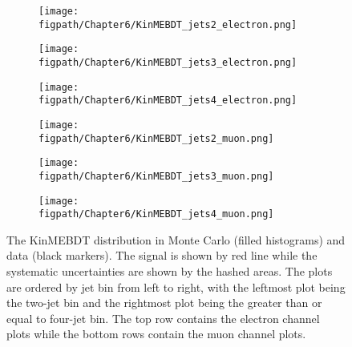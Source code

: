 \begin{figure}[!hbtp]
    \centering
    \begin{subfigure}[t]{0.316\textwidth}
        \texttt{[image: \\figpath/Chapter6/KinMEBDT\_jets2\_electron.png]}
        \caption{}
        \label{fig:KinMEBDT_jets2_electron}
    \end{subfigure}
    \begin{subfigure}[t]{0.316\textwidth}
        \texttt{[image: \\figpath/Chapter6/KinMEBDT\_jets3\_electron.png]}
        \caption{}
        \label{fig:KinMEBDT_jets3_electron}
    \end{subfigure}
    \begin{subfigure}[t]{0.316\textwidth}
        \texttt{[image: \\figpath/Chapter6/KinMEBDT\_jets4\_electron.png]}
        \caption{}
        \label{fig:KinMEBDT_jets4_electron}
    \end{subfigure}

    \begin{subfigure}[t]{0.316\textwidth}
        \texttt{[image: \\figpath/Chapter6/KinMEBDT\_jets2\_muon.png]}
        \caption{}
        \label{fig:KinMEBDT_jets2_muon}
    \end{subfigure}
    \begin{subfigure}[t]{0.316\textwidth}
        \texttt{[image: \\figpath/Chapter6/KinMEBDT\_jets3\_muon.png]}
        \caption{}
        \label{fig:KinMEBDT_jets3_muon}
    \end{subfigure}
    \begin{subfigure}[t]{0.316\textwidth}
        \texttt{[image: \\figpath/Chapter6/KinMEBDT\_jets4\_muon.png]}
        \caption{}
        \label{fig:KinMEBDT_jets4_muon}
    \end{subfigure}
    \caption{The KinMEBDT distribution in Monte Carlo (filled histograms) and data (black markers). The \HWW signal is shown by red line while the systematic uncertainties are shown by the hashed areas. The plots are ordered by jet bin from left to right, with the leftmost plot being the two-jet bin and the rightmost plot being the greater than or equal to four-jet bin. The top row contains the electron channel plots while the bottom rows contain the muon channel plots.}
    \label{fig:KinMEBDT_final_templates}
\end{figure}

